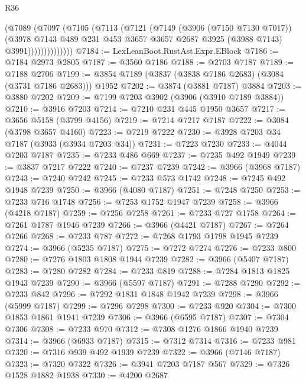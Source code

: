 \begin{lexlean}{R36}
\begin{coremodule}
                  (@7089
                    (@7097
                      (@7105
                        (@7113
                          (@7121
                            (@7149
                              (@3906 (@7150 @7130 @7017))
                              (@3978
                                @7143
                                @489
                                @231
                                @453
                                @3657
                                @3657
                                @2687
                                @3925
                                (@3988 @7143)
                                @3991))))))))))))))
@7184 := LexLeanBoot.RustAst.Expr.EBlock
@7186 := @7184 @2973 @2805
@7187 := @3560 @7186
@7188 := @2703 @7187
@7189 := @7188 @2706
@7199 := @3854 @7189 (@3837 (@3838 @7186 @2683) (@3084 (@3731 @7186 @2683))) @1952
@7202 := @3874 (@3881 @7187) @3884
@7203 := @3880 @7202
@7209 := @7199 @7203 @3902 (@3906 (@3910 @7189 @3884))
@7210 := @3916 @7203
@7214 := @7210 @231 @445 @1950 @3657
@7217 := @3656 @5158 (@3799 @4156)
@7219 := @7214 @7217 @7187
@7222 := @3084 (@3798 @3657 @4160)
@7223 := @7219 @7222
@7230 := @3928 @7203 @34 @7187 (@3933 (@3934 @7203 @34))
@7231 := @7223 @7230
@7233 := @4044 @7203 @7187
@7235 := @7233 @486 @669
@7237 := @7235 @492 @1949
@7239 := @3837 @7217 @7222
@7240 := @7237 @7239
@7242 := @3966 (@3968 @7187)
@7243 := @7240 @7242
@7245 := @7233 @573 @1742
@7248 := @7245 @492 @1948 @7239
@7250 := @3966 (@4080 @7187)
@7251 := @7248 @7250
@7253 := @7233 @716 @1748
@7256 := @7253 @1752 @1947 @7239
@7258 := @3966 (@4218 @7187)
@7259 := @7256 @7258
@7261 := @7233 @727 @1758
@7264 := @7261 @1787 @1946 @7239
@7266 := @3966 (@4421 @7187)
@7267 := @7264 @7266
@7268 := @7233 @787
@7272 := @7268 @1793 @1798 @1945 @7239
@7274 := @3966 (@5235 @7187)
@7275 := @7272 @7274
@7276 := @7233 @800
@7280 := @7276 @1803 @1808 @1944 @7239
@7282 := @3966 (@5407 @7187)
@7283 := @7280 @7282
@7284 := @7233 @819
@7288 := @7284 @1813 @1825 @1943 @7239
@7290 := @3966 (@5597 @7187)
@7291 := @7288 @7290
@7292 := @7233 @842
@7296 := @7292 @1831 @1848 @1942 @7239
@7298 := @3966 (@5999 @7187)
@7299 := @7296 @7298
@7300 := @7233 @920
@7304 := @7300 @1853 @1861 @1941 @7239
@7306 := @3966 (@6595 @7187)
@7307 := @7304 @7306
@7308 := @7233 @970
@7312 := @7308 @1276 @1866 @1940 @7239
@7314 := @3966 (@6933 @7187)
@7315 := @7312 @7314
@7316 := @7233 @981
@7320 := @7316 @939 @492 @1939 @7239
@7322 := @3966 (@7146 @7187)
@7323 := @7320 @7322
@7326 := @3941 @7203 @7187 @567
@7329 := @7326 @1528 @1882 @1938
@7330 := @4200 @2687

\end{coremodule}
\end{lexlean}
